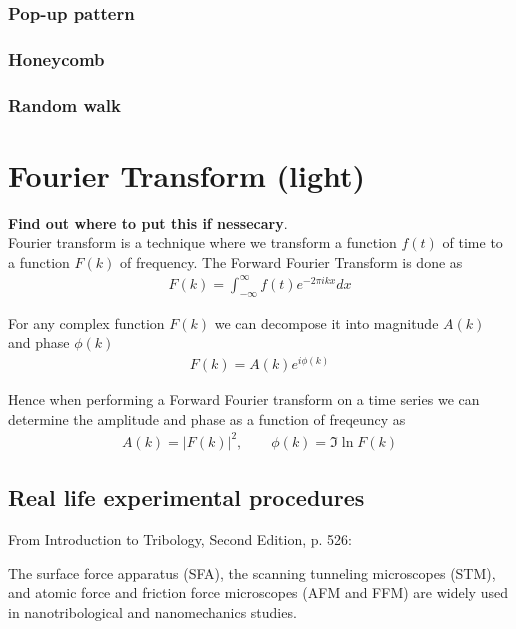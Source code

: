 \subsubsection{Pop-up pattern}
\subsubsection{Honeycomb}
\subsubsection{Random walk}







\section{Fourier Transform (light)}

\textbf{Find out where to put this if nessecary}. \\

Fourier transform is a technique where we transform a function $f(t)$ of time to a function $F(k)$ of frequency. The Forward Fourier Transform is done as
\begin{align*}
  F(k) = \int_{-\infty}^\infty f(t) e^{-2\pi ikx} dx
\end{align*}

For any complex function $F(k)$ we can decompose it into magnitude $A(k)$ and phase $\phi(k)$
\begin{align*}
  F(k) = A(k) e^{i \phi(k)}
\end{align*}

Hence when performing a Forward Fourier transform on a time series we can determine the amplitude and phase as a function of freqeuncy as 
\begin{align*}
  A(k) = |F(k)|^2, \qquad \phi(k) = \Im{\ln{F(k)}}
\end{align*}





\subsection{Real life experimental procedures}
From Introduction to Tribology, Second Edition, p. 526: \par The surface force apparatus (SFA), the scanning tunneling microscopes (STM),
and atomic force and friction force microscopes (AFM and FFM) are widely used in nanotribological and nanomechanics studies.



